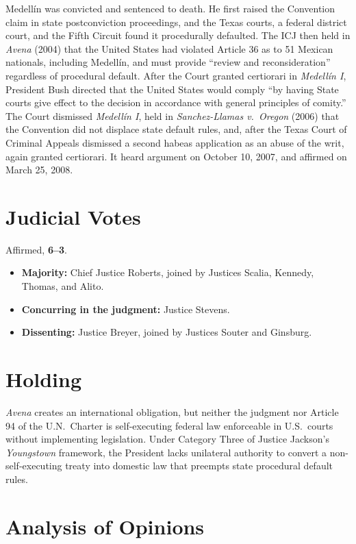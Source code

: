 \documentclass[12pt]{article}
\begin{document}
Medell\'{i}n was convicted and sentenced to death. He first raised the Convention claim in state postconviction proceedings, and the Texas courts, a federal district court, and the Fifth Circuit found it procedurally defaulted. The ICJ then held in \textit{Avena} (2004) that the United States had violated Article 36 as to 51 Mexican nationals, including Medell\'{i}n, and must provide ``review and reconsideration'' regardless of procedural default. After the Court granted certiorari in \textit{Medell\'{i}n I}, President Bush directed that the United States would comply ``by having State courts give effect to the decision in accordance with general principles of comity.'' The Court dismissed \textit{Medell\'{i}n I}, held in \textit{Sanchez-Llamas v.\ Oregon} (2006) that the Convention did not displace state default rules, and, after the Texas Court of Criminal Appeals dismissed a second habeas application as an abuse of the writ, again granted certiorari. It heard argument on October 10, 2007, and affirmed on March 25, 2008.

\section{Judicial Votes}

Affirmed, \textbf{6--3}.
\begin{itemize}
\item \textbf{Majority:} Chief Justice Roberts, joined by Justices Scalia, Kennedy, Thomas, and Alito.
\item \textbf{Concurring in the judgment:} Justice Stevens.
\item \textbf{Dissenting:} Justice Breyer, joined by Justices Souter and Ginsburg.
\end{itemize}

\section{Holding}

\textit{Avena} creates an international obligation, but neither the judgment nor Article 94 of the U.N.\ Charter is self-executing federal law enforceable in U.S.\ courts without implementing legislation. Under Category Three of Justice Jackson's \textit{Youngstown} framework, the President lacks unilateral authority to convert a non-self-executing treaty into domestic law that preempts state procedural default rules.

\section{Analysis of Opinions}
\end{document}
